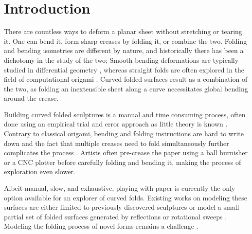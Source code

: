 \section{Introduction}
There are countless ways to deform a planar sheet without stretching or tearing it. One can bend it, form sharp creases by folding it, or combine the two. Folding and bending isometries are different by nature, and historically there has been a dichotomy in the study of the two; Smooth bending deformations are typically studied in differential geometry \cite{do_carmo}, whereas straight folds are often explored in the field of computational origami \cite{origami_book}. Curved folded surfaces \cite{huffman} result as a combination of the two, as folding an inextensible sheet along a curve necessitates global bending around the crease.

Building curved folded sculptures is a manual and time consuming process, often done using an empirical trial and error approach  as little theory is known \cite{curved_review,huffmann_reconstructing}. Contrary to classical origami, bending and folding instructions are hard to write down and the fact that multiple creases need to fold simultaneously further complicates the process \cite{StringActuated:2017}. Artists often pre-crease the paper using a ball burnisher or a CNC plotter before carefully folding and bending it, making the process of exploration even slower. 

Albeit manual, slow, and exhaustive, playing with paper is currently the only option available for an explorer of curved folds. Existing works on modeling these surfaces are either limited to previously discovered sculptures \cite{curved_folding_kilian,StringActuated:2017} or model a small partial set of folded surfaces generated by reflections or rotational sweeps \cite{Mitani_ref,mitani2009design}. Modeling the folding process of novel forms remains a challenge \cite{curved_review}. 

